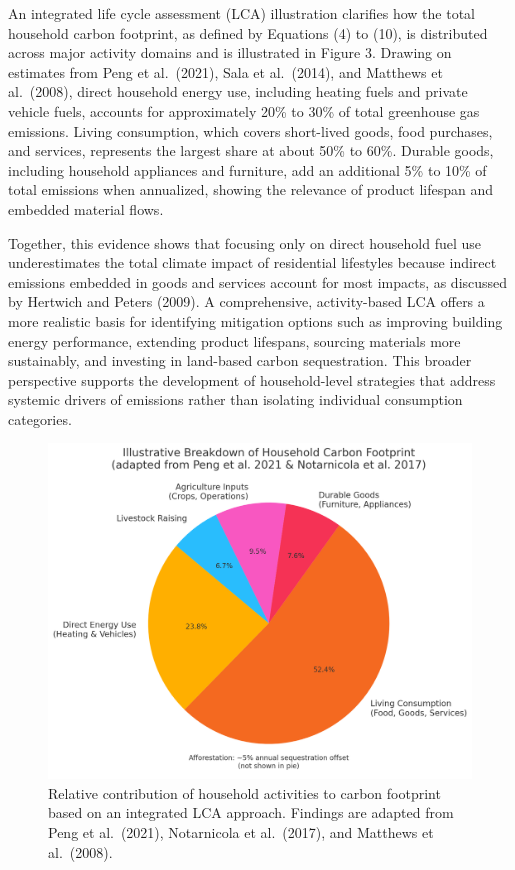 \documentclass[12pt,a4paper]{article}%
\begin{document}
An integrated life cycle assessment (LCA) illustration clarifies how the total household carbon footprint, as defined by Equations (4) to (10), is distributed across major activity domains and is illustrated in Figure 3. Drawing on estimates from Peng et al.\ (2021), Sala et al.\ (2014), and Matthews et al.\ (2008), direct household energy use, including heating fuels and private vehicle fuels, accounts for approximately 20\% to 30\% of total greenhouse gas emissions. Living consumption, which covers short-lived goods, food purchases, and services, represents the largest share at about 50\% to 60\%. Durable goods, including household appliances and furniture, add an additional 5\% to 10\% of total emissions when annualized, showing the relevance of product lifespan and embedded material flows. 

Together, this evidence shows that focusing only on direct household fuel use underestimates the total climate impact of residential lifestyles because indirect emissions embedded in goods and services account for most impacts, as discussed by Hertwich and Peters (2009). A comprehensive, activity-based LCA offers a more realistic basis for identifying mitigation options such as improving building energy performance, extending product lifespans, sourcing materials more sustainably, and investing in land-based carbon sequestration. This broader perspective supports the development of household-level strategies that address systemic drivers of emissions rather than isolating individual consumption categories.


\begin{figure}[h]
\centering
\includegraphics[width=0.8\linewidth]{LCA_pie.png}
\small \caption{Relative contribution of household activities to carbon footprint based on an integrated LCA approach. Findings are adapted from Peng et al.\ (2021), Notarnicola et al.\ (2017), and Matthews et al.\ (2008).}
\end{figure}
\end{document}
